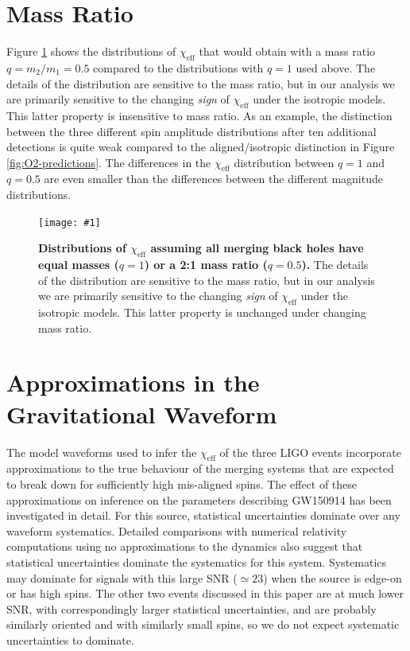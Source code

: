 \documentclass{nature}
\newcommand{\chieff}{\chi_\mathrm{eff}}
\newcommand{\plotone}[1]{\texttt{[image: \#1]}}
\begin{document}
\begin{methods}
\section{Mass Ratio}
\label{sec:mass-ratio}

Figure \ref{fig:mass-ratio-sensitivity} shows the distributions of
$\chieff$ that would obtain with a mass ratio $q = m_2/m_1 = 0.5$
compared to the distributions with $q = 1$ used above.  The details of
the distribution are sensitive to the mass ratio, but in our analysis
we are primarily sensitive to the changing \emph{sign} of $\chieff$
under the isotropic models.  This latter property is insensitive to
mass ratio.  As an example, the distinction between the three
different spin amplitude distributions after ten additional detections
is quite weak compared to the aligned/isotropic distinction in Figure
\ref{fig:O2-predictions}.  The differences in the $\chieff$
distribution between $q = 1$ and $q = 0.5$ are even smaller than the
differences between the different magnitude distributions.

\begin{figure}
  \plotone{../plots/chi-eff-distributions-q05}
  \caption{\textbf{Distributions of $\chieff$ assuming all merging
      black holes have equal masses ($q=1$) or a 2:1 mass ratio
      ($q = 0.5$).}  The details of the distribution are sensitive to
    the mass ratio, but in our analysis we are primarily sensitive to
    the changing \emph{sign} of $\chieff$ under the isotropic models.
    This latter property is unchanged under changing mass ratio.}
  \label{fig:mass-ratio-sensitivity}
\end{figure}

\section{Approximations in the Gravitational Waveform}
The model waveforms used to infer the $\chieff$ of the three LIGO
events incorporate approximations to the true behaviour of the merging
systems that are expected to break down for sufficiently high
mis-aligned spins.  The effect of these approximations on inference on
the parameters describing GW150914 has been investigated in
detail\cite{2016arXiv161107531T}.  For this source, statistical
uncertainties dominate over any waveform systematics.  Detailed
comparisons with numerical relativity computations using no
approximations to the dynamics\cite{2016PhRvD..94f4035A} also suggest
that statistical uncertainties dominate the systematics for this
system.  Systematics may dominate for signals with this large SNR
($\simeq 23$) when the source is edge-on or has high
spins\cite{2016arXiv161107531T}.  The other two events discussed in
this paper are at much lower SNR, with correspondingly larger
statistical uncertainties, and are probably similarly oriented and
with similarly small spins, so we do not expect systematic
uncertainties to dominate.


\end{methods}
\end{document}
